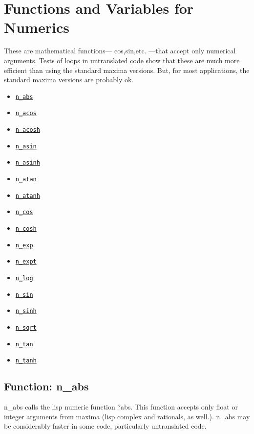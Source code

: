 \documentclass[]{article}
\begin{document}
\section{Functions and Variables for Numerics}

 These are mathematical functions--- cos,sin,etc. ---that accept only
 numerical arguments. Tests of loops in untranslated code show that these are much
 more efficient than using the standard maxima versions. But, for most applications, the
 standard maxima versions are probably ok.
\begin{itemize}
\item \hyperlink{n_abs}{{\tt n\_abs}}
\item \hyperlink{n_acos}{{\tt n\_acos}}
\item \hyperlink{n_acosh}{{\tt n\_acosh}}
\item \hyperlink{n_asin}{{\tt n\_asin}}
\item \hyperlink{n_asinh}{{\tt n\_asinh}}
\item \hyperlink{n_atan}{{\tt n\_atan}}
\item \hyperlink{n_atanh}{{\tt n\_atanh}}
\item \hyperlink{n_cos}{{\tt n\_cos}}
\item \hyperlink{n_cosh}{{\tt n\_cosh}}
\item \hyperlink{n_exp}{{\tt n\_exp}}
\item \hyperlink{n_expt}{{\tt n\_expt}}
\item \hyperlink{n_log}{{\tt n\_log}}
\item \hyperlink{n_sin}{{\tt n\_sin}}
\item \hyperlink{n_sinh}{{\tt n\_sinh}}
\item \hyperlink{n_sqrt}{{\tt n\_sqrt}}
\item \hyperlink{n_tan}{{\tt n\_tan}}
\item \hyperlink{n_tanh}{{\tt n\_tanh}}
\end{itemize}
\subsection{Function: n\_abs\label{sec:n_abs}}
\hypertarget{n_abs}{}



\vspace{5 pt}
n\_abs calls the lisp numeric function ?abs. This function accepts only float or integer arguments from maxima (lisp complex and rationals, as well.). n\_abs may be considerably faster in some code, particularly untranslated code. 
\end{document}
